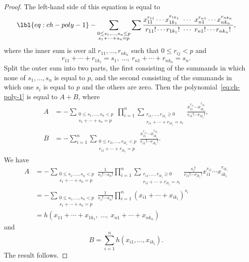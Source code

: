 \begin{proof}
The left-hand side of this equation is equal to
% 
\begin{equation}
\lbl{eq:ch-poly-1}
-\sum_{\substack{0 \leq s_1, \ldots, s_n \leq p\\ s_1 + \cdots + s_n = p}}
\sum
\frac{x_{11}^{r_{11}} \cdots x_{1k_1}^{r_{1k_1}} \ \cdots \ 
x_{n1}^{r_{n1}} \cdots x_{nk_n}^{r_{nk_n}}}%
{r_{11}! \cdots r_{1k_1}! \ \cdots \ r_{n1}! \cdots r_{nk_n}!},
\end{equation}
% 
where the inner sum is over all $r_{11}, \ldots, r_{nk_n}$ such
that $0 \leq r_{ij} < p$ and 
\[
r_{11} + \cdots + r_{1k_1} = s_1,
\ \ldots,\ 
r_{n1} + \cdots + r_{nk_n} = s_n.
\]
Split the outer sum into two parts, the
first consisting of the summands in which none of $s_1, \ldots, s_n$ is
equal to $p$, and the second consisting of the summands in which one $s_i$
is equal to $p$ and the others are zero.  Then the
polynomial~\eqref{eq:ch-poly-1} is equal to $A + B$, where
% 
\begin{align*}
A       &
=
-\sum_{\substack{0 \leq s_1, \ldots, s_n < p\\ s_1 + \cdots + s_n = p}}
\prod_{i = 1}^n
\sum_{\substack{r_{i1}, \ldots, r_{ik_i} \geq 0\\ 
r_{i1} + \cdots + r_{ik_i} = s_i}}
\frac{x_{i1}^{r_{i1}} \cdots x_{ik_i}^{r_{ik_i}}}%
{r_{i1}! \cdots r_{ik_i}!},     \\
B       &
=
-\sum_{i = 1}^n 
\sum_{\substack{0 \leq r_{i1}, \ldots, r_{ik_i} < p\\ 
r_{i1} + \cdots + r_{ik_i} = p}}
\frac{x_{i1}^{r_{i1}} \cdots x_{ik_i}^{r_{ik_i}}}%
{r_{i1}! \cdots r_{ik_i}!}.
\end{align*}
% 
We have
% 
\begin{align*}
A       &
=
-\sum_{\substack{0 \leq s_1, \ldots, s_n < p\\ s_1 + \cdots + s_n = p}}
\frac{1}{s_1! \cdots s_n!}
\prod_{i = 1}^n
\sum_{\substack{r_{i1}, \ldots, r_{ik_i} \geq 0\\ 
r_{i1} + \cdots + r_{ik_i} = s_i}}
\frac{s_i!}{r_{i1}! \cdots r_{ik_i}!}      
x_{i1}^{r_{i1}} \cdots x_{ik_i}^{r_{ik_i}}  \\
&
=
-\sum_{\substack{0 \leq s_1, \ldots, s_n < p\\ s_1 + \cdots + s_n = p}}
\frac{1}{s_1! \cdots s_n!}
\prod_{i = 1}^n
(x_{i1} + \cdots + x_{ik_i})^{s_i}      \\
&
=
h(x_{11} + \cdots + x_{1k_1}, \ \ldots,\ 
x_{n1} + \cdots + x_{nk_n})
\end{align*}
% 
and
\[
B = 
\sum_{i = 1}^n h(x_{i1}, \ldots, x_{ik_i}).
\]
The result follows.
\end{proof}

